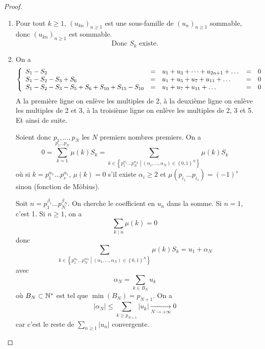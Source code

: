\documentclass[12pt]{article}
\begin{document}
\begin{proof}
	\phantom{}
	\begin{enumerate}
		\item Pour tout $k\geqslant1$, $\left(u_{kn}\right)_{n\geqslant1}$ est une sous-famille de $\left(u_{n}\right)_{n\geqslant1}$ sommable, donc $\left(u_{kn}\right)_{n\geqslant1}$ est sommable.
		\begin{equation}\boxed{\text{Donc }S_{k}\text{ existe.}}\end{equation}

		\item On a 
		\begin{equation}
		\left\{
			\begin{array}[]{lllll}
				S_{1}-S_{2} &= &u_{1}+u_{3}+\dots+u_{2n+1}+\dots &= &0\\
				S_{1}-S_{2}-S_{3}+S_{6} &= &u_{1}+u_{5}+u_{7}+u_{11}+\dots &= &0\\
				S_{1}-S_{2}-S_{3}-S_{5}+S_{6}+S_{10}+S_{15}-S_{10} &= &u_{1}+u_{7}+u_{11}+\dots &= &0
			\end{array}
		\right.
		\end{equation}
		A la première ligne on enlève les multiples de 2, à la deuxième ligne on enlève les multiples de 2 et 3, à la troisième ligne on enlève les multiples de 2, 3 et 5. Et ainsi de suite.

		Soient donc $p_{1},\dots,p_{N}$ les $N$ premiers nombres premiers. On a 
		\begin{equation}0=\sum_{k=1}^{p_{1}\dots p_{N}}\mu(k)S_{k}=\sum_{k\in\left\{p_{1}^{\alpha_{1}}\dots p_{N}^{\alpha_{N}}\middle|\left(\alpha_{1},\dots,\alpha_{N}\right)\in\left\{0,1\right\}^{N}\right\}}\mu(k)S_{k}\end{equation}
		où si $k=p_{1}^{\alpha_{1}}\dots p_{r}^{\alpha_{r}}$, $\mu(k)=0$ s'il existe $\alpha_{i}\geqslant 2$ et $\mu\left(p_{i_{1}}\dots p_{i_{s}}\right)=\left(-1\right)^{s}$ sinon (fonction de Möbius).

		Soit $n=p_{1}^{\beta_{1}}\dots p_{N}^{\beta_{N}}$. On cherche le coefficient en $u_{n}$ dans la somme. Si $n=1$, c'est 1. Si $n\geqslant 1$, on a 
		\begin{equation}\sum_{k\mid n}\mu(k)=0\end{equation}
		donc 
		\begin{equation}\sum_{k\in\left\{p_{1}^{\alpha_{1}}\dots p_{N}^{\alpha_{N}}\middle|\left(\alpha_{1},\dots,\alpha_{N}\right)\in\left\{0,1\right\}^{N}\right\}}\mu(k)S_{k}=u_{1}+\alpha_{N}\end{equation}
		avec 
		\begin{equation}\alpha_{N}=\sum_{k\in B_{N}}u_{k}\end{equation}
		où $B_{N}\subset\mathbb{N}^{*}$ est tel que $\min\left(B_{N}\right)=p_{N+1}$. On a 
		\begin{equation}\left\lvert \alpha_{N}\right\rvert\leqslant\sum_{k\geqslant p_{N+1}}\left\lvert u_{k}\right\rvert\xrightarrow[N\to+\infty]{}0\end{equation}
		car c'est le reste de $\sum_{n\geqslant 1}\left\lvert u_n\right\rvert$ convergente.


\end{enumerate}
\end{proof}
\end{document}
